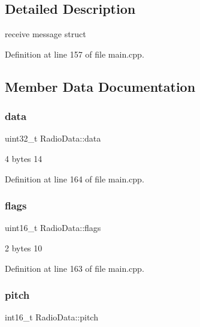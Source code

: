 \subsection{Detailed Description}
receive message struct 

Definition at line 157 of file main.\+cpp.



\subsection{Member Data Documentation}
\mbox{\label{structRadioData_a81f0599626e9bd8e665e121e93fb2828}} 
\subsubsection{\texorpdfstring{data}{data}}
{\footnotesize\ttfamily uint32\+\_\+t Radio\+Data\+::data}



4 bytes 14 



Definition at line 164 of file main.\+cpp.

\mbox{\label{structRadioData_a9f2953e3cc37197626626a999842e74d}} 
\subsubsection{\texorpdfstring{flags}{flags}}
{\footnotesize\ttfamily uint16\+\_\+t Radio\+Data\+::flags}



2 bytes 10 



Definition at line 163 of file main.\+cpp.

\mbox{\label{structRadioData_a88551ed8975dd848369ddf8f3511743c}} 
\subsubsection{\texorpdfstring{pitch}{pitch}}
{\footnotesize\ttfamily int16\+\_\+t Radio\+Data\+::pitch}



